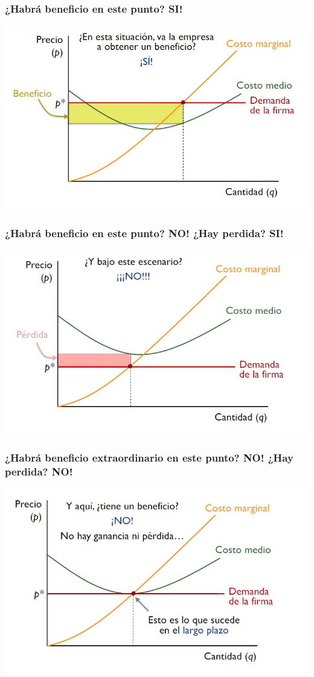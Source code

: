 \documentclass{beamer}
\begin{document}
\begin{frame}
\frametitle{¿Habrá beneficio en este punto? SI!}
\includegraphics[scale=0.55]{Slides Principios de Economia/Figures/Tema_07.11_compperfecta5.jpg}
\end{frame}

\begin{frame}
\frametitle{¿Habrá beneficio en este punto? NO! ¿Hay perdida? SI!}
\includegraphics[scale=0.55]{Slides Principios de Economia/Figures/Tema_07.12_compperfecta6.jpg}
\end{frame}

\begin{frame}
\frametitle{¿Habrá beneficio extraordinario en este punto? NO! ¿Hay perdida? NO!}
\includegraphics[scale=0.55]{Slides Principios de Economia/Figures/Tema_07.13_compperfecta7.jpg}
\end{frame}
\end{document}
